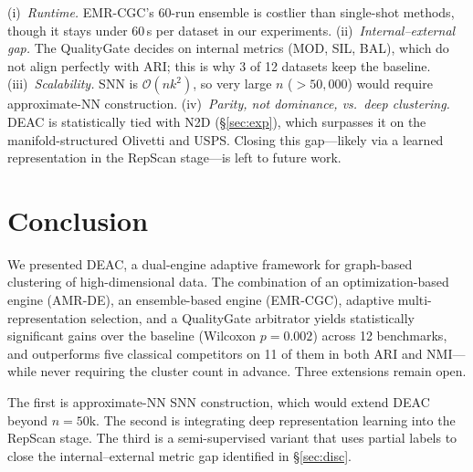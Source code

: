 \documentclass[conference]{IEEEtran}
\begin{document}
(i)~\emph{Runtime.} EMR-CGC's 60-run ensemble is costlier than single-shot methods, though it stays under 60\,s per dataset in our experiments.
(ii)~\emph{Internal--external gap.} The QualityGate decides on internal metrics (MOD, SIL, BAL), which do not align perfectly with ARI; this is why 3 of 12 datasets keep the baseline.
(iii)~\emph{Scalability.} SNN is $\mathcal{O}(n k^2)$, so very large $n$ ($>50{,}000$) would require approximate-NN construction.
(iv)~\emph{Parity, not dominance, vs.\ deep clustering.} DEAC is statistically tied with N2D (\S\ref{sec:exp}), which surpasses it on the manifold-structured Olivetti and USPS. Closing this gap---likely via a learned representation in the RepScan stage---is left to future work.

\section{Conclusion}\label{sec:conc}

We presented DEAC, a dual-engine adaptive framework for graph-based clustering of high-dimensional data. The combination of an optimization-based engine (AMR-DE), an ensemble-based engine (EMR-CGC), adaptive multi-representation selection, and a QualityGate arbitrator yields statistically significant gains over the baseline (Wilcoxon $p{=}0.002$) across 12 benchmarks, and outperforms five classical competitors on 11 of them in both ARI and NMI---while never requiring the cluster count in advance. Three extensions remain open.

The first is approximate-NN SNN construction, which would extend DEAC beyond $n{=}50$k. The second is integrating deep representation learning into the RepScan stage. The third is a semi-supervised variant that uses partial labels to close the internal--external metric gap identified in \S\ref{sec:disc}.
\end{document}
